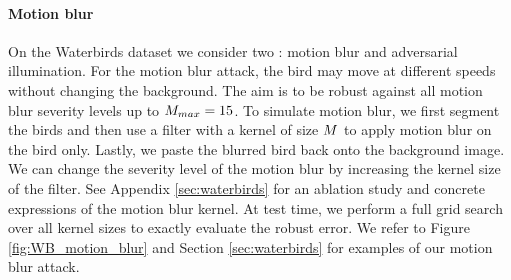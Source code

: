 \paragraph{Motion blur}
On the Waterbirds dataset we consider two \nameofattacks: motion blur and adversarial illumination. For the motion blur attack,
the bird may move at different speeds without changing the background. 
The aim is to be robust against all motion blur severity levels up to $M_{max} = 15$. 
To simulate motion blur, we first segment the birds and then use a filter with a kernel of size $M$ to apply motion blur on the bird only. Lastly, we paste the blurred bird back onto the background image. We can change the severity level of the motion blur by increasing the kernel size of the filter.
See Appendix \ref{sec:waterbirds} for an ablation study and concrete expressions of the motion blur kernel. At test time, we perform a full grid search over all kernel sizes to exactly evaluate the robust error. We refer to Figure \ref{fig:WB_motion_blur} and Section \ref{sec:waterbirds} for examples of our motion blur attack.

